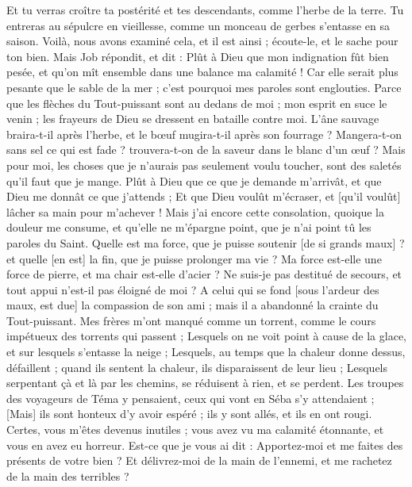 \begin{multicols}{2}
Et tu verras croître ta postérité et tes descendants, comme l'herbe de la terre.
Tu entreras au sépulcre en vieillesse, comme un monceau de gerbes s'entasse en sa saison.
Voilà, nous avons examiné cela, et il est ainsi ; écoute-le, et le sache pour ton bien.
\VerseOne{}Mais Job répondit, et dit :
Plût à Dieu que mon indignation fût bien pesée, et qu'on mît ensemble dans une balance ma calamité !
Car elle serait plus pesante que le sable de la mer ; c'est pourquoi mes paroles sont englouties.
Parce que les flèches du Tout-puissant sont au dedans de moi ; mon esprit en suce le venin ; les frayeurs de Dieu se dressent en bataille contre moi.
L'âne sauvage braira-t-il après l'herbe, et le bœuf mugira-t-il après son fourrage ?
Mangera-t-on sans sel ce qui est fade ? trouvera-t-on de la saveur dans le blanc d'un œuf ?
Mais pour moi, les choses que je n'aurais pas seulement voulu toucher, sont des saletés qu'il faut que je mange.
Plût à Dieu que ce que je demande m'arrivât, et que Dieu me donnât ce que j'attends ;
Et que Dieu voulût m'écraser, et [qu'il voulût] lâcher sa main pour m'achever !
Mais j'ai encore cette consolation, quoique la douleur me consume, et qu'elle ne m'épargne point, que je n'ai point tû les paroles du Saint.
Quelle est ma force, que je puisse soutenir [de si grands maux] ? et quelle [en est] la fin, que je puisse prolonger ma vie ?
Ma force est-elle une force de pierre, et ma chair est-elle d'acier ?
Ne suis-je pas destitué de secours, et tout appui n'est-il pas éloigné de moi ?
A celui qui se fond [sous l'ardeur des maux, est due] la compassion de son ami ; mais il a abandonné la crainte du Tout-puissant.
Mes frères m'ont manqué comme un torrent, comme le cours impétueux des torrents qui passent ;
Lesquels on ne voit point à cause de la glace, et sur lesquels s'entasse la neige ;
Lesquels, au temps que la chaleur donne dessus, défaillent ; quand ils sentent la chaleur, ils disparaissent de leur lieu ;
Lesquels serpentant çà et là par les chemins, se réduisent à rien, et se perdent.
Les troupes des voyageurs de Téma y pensaient, ceux qui vont en Séba s'y attendaient ;
[Mais] ils sont honteux d'y avoir espéré ; ils y sont allés, et ils en ont rougi.
Certes, vous m'êtes devenus inutiles ; vous avez vu ma calamité étonnante, et vous en avez eu horreur.
Est-ce que je vous ai dit : Apportez-moi et me faites des présents de votre bien ?
Et délivrez-moi de la main de l'ennemi, et me rachetez de la main des terribles ?

\end{multicols}
